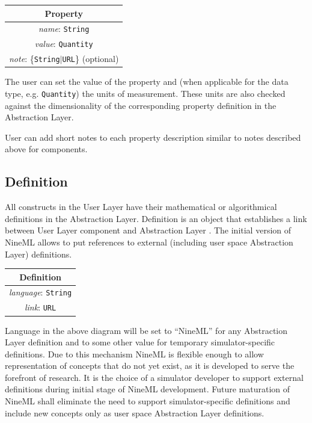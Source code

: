 \documentclass[draftspec]{ninemlspec}
\newcommand{\ComponentClass}{\textbf{\class{ComponentClass}}\xspace}
\begin{document}
\begin{table}[htb]
\center
\begin{tabular}{|c|}
\hline
\hline
Property \\
\hline
\hline
{\em name}: {\tt String} \\
\hline
{\em value}: {\tt Quantity} \\
\hline
{\em note}: \{{\tt String}$|${\tt URL}\} (optional)\\
\hline
\end{tabular}
\end{table}

The user can set the value of the property and (when applicable for the data
type, e.g. {\tt Quantity}) the units of measurement. These units are also
checked against the dimensionality of the corresponding property definition
in the Abstraction Layer.

User can add short notes to each property description similar to notes
described above for components.

\subsection{Definition}

All constructs in the User Layer have their mathematical or algorithmical
definitions in the Abstraction Layer. Definition is an object that
establishes a link between User Layer component and Abstraction Layer
\ComponentClass. The initial version of NineML allows to put references
to external (including user space Abstraction Layer) definitions.

\begin{table}[htb]
\center
\begin{tabular}{|c|}
\hline
\hline
Definition \\
\hline
\hline
{\em language}: {\tt String} \\
\hline
{\em link}: {\tt URL}\\
\hline
\end{tabular}
\end{table}

Language in the above diagram will be set to ``NineML'' for any Abstraction
Layer definition and to some other value for temporary simulator-specific
definitions. Due to this mechanism
NineML is flexible enough to allow representation of concepts that do not
yet exist, as it is developed to serve the forefront of research.
It is the choice of a simulator developer to support external definitions
during initial stage of NineML development. Future maturation of NineML shall
eliminate the need to support simulator-specific definitions and include new
concepts only as user space Abstraction Layer definitions.
\end{document}
